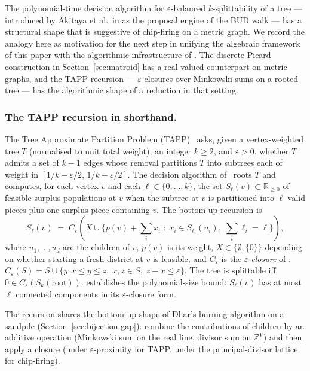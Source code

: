 \documentclass[11pt]{article}
\newcommand{\Z}{\mathbb{Z}}
\newcommand{\R}{\mathbb{R}}
\begin{document}
The polynomial-time decision algorithm for $\varepsilon$-balanced
$k$-splittability of a tree --- introduced by Akitaya et al.\ in
\cite{akitaya2026bud} as the proposal engine of the BUD walk --- has a
structural shape that is suggestive of chip-firing on a metric graph.
We record the analogy here as motivation for the next step in unifying
the algebraic framework of this paper with the algorithmic
infrastructure of \cite{akitaya2026bud}. The discrete Picard
construction in Section~\ref{sec:matroid} has a real-valued counterpart
on metric graphs, and the TAPP recursion --- $\varepsilon$-closures over
Minkowski sums on a rooted tree --- has the algorithmic shape of a
reduction in that setting.

\subsubsection*{The TAPP recursion in shorthand.}

The Tree Approximate Partition Problem
(TAPP)~\cite[Section~C]{akitaya2026bud} asks, given a vertex-weighted
tree $T$ (normalised to unit total weight), an integer $k \geq 2$, and
$\varepsilon > 0$, whether $T$ admits a set of $k-1$ edges whose
removal partitions $T$ into subtrees each of weight in
$[1/k - \varepsilon/2,\,1/k + \varepsilon/2]$.
The decision algorithm of~\cite[Theorem~C.10]{akitaya2026bud} roots
$T$ and computes, for each vertex $v$ and each $\ell \in \{0,\ldots,k\}$,
the set $S_\ell(v) \subset \R_{\geq 0}$ of feasible surplus populations
at $v$ when the subtree at $v$ is partitioned into $\ell$ valid pieces
plus one surplus piece containing $v$. The bottom-up recursion is
\[
  S_\ell(v) \;=\; C_\varepsilon\!\left( X \cup
    \biggl\{ p(v) + \sum_{i} x_i \;:\; x_i \in S_{\ell_i}(u_i),\;
    \textstyle\sum_i \ell_i = \ell \biggr\} \right),
\]
where $u_1, \ldots, u_d$ are the children of $v$, $p(v)$ is its weight,
$X \in \{\emptyset, \{0\}\}$ depending on whether starting a fresh
district at $v$ is feasible, and $C_\varepsilon$ is the
\emph{$\varepsilon$-closure} of \cite[Definition~C.2]{akitaya2026bud}:
$C_\varepsilon(S) = S \cup \{y : x \leq y \leq z,\; x,z \in S,\; z-x \leq \varepsilon\}$.
The tree is splittable iff $0 \in C_\varepsilon(S_k(\mathrm{root}))$.
\cite[Lemma~C.8]{akitaya2026bud} establishes the polynomial-size
bound: $S_\ell(v)$ has at most $\ell$ connected components in its
$\varepsilon$-closure form.

The recursion shares the bottom-up shape of Dhar's burning algorithm
on a sandpile (Section~\ref{sec:bijection-gap}): combine the
contributions of children by an additive operation
(Minkowski sum on the real line, divisor sum on $\Z^V$) and then
apply a closure (under $\varepsilon$-proximity for TAPP, under the
principal-divisor lattice for chip-firing).
\end{document}
